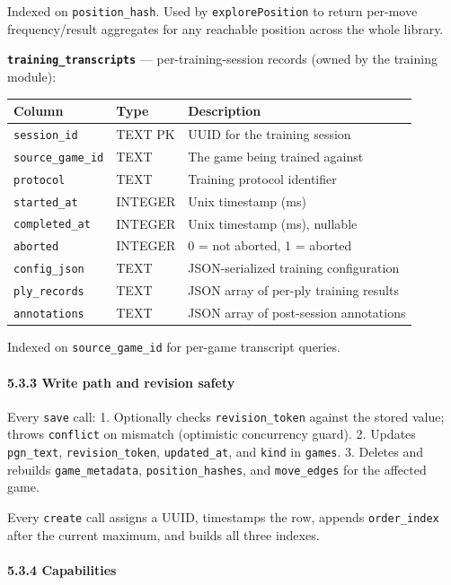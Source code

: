\documentclass[]{article}
\let\oldparagraph\paragraph
\renewcommand{\paragraph}[1]{\oldparagraph{#1}\mbox{}}
\begin{document}
Indexed on \texttt{position\_hash}. Used by \texttt{explorePosition} to
return per-move frequency/result aggregates for any reachable position
across the whole library.

\textbf{\texttt{training\_transcripts}} --- per-training-session records
(owned by the training module):

\begin{longtable}[]{@{}lll@{}}
\toprule
Column & Type & Description\tabularnewline
\midrule
\endhead
\texttt{session\_id} & TEXT PK & UUID for the training
session\tabularnewline
\texttt{source\_game\_id} & TEXT & The game being trained
against\tabularnewline
\texttt{protocol} & TEXT & Training protocol identifier\tabularnewline
\texttt{started\_at} & INTEGER & Unix timestamp (ms)\tabularnewline
\texttt{completed\_at} & INTEGER & Unix timestamp (ms),
nullable\tabularnewline
\texttt{aborted} & INTEGER & 0 = not aborted, 1 = aborted\tabularnewline
\texttt{config\_json} & TEXT & JSON-serialized training
configuration\tabularnewline
\texttt{ply\_records} & TEXT & JSON array of per-ply training
results\tabularnewline
\texttt{annotations} & TEXT & JSON array of post-session
annotations\tabularnewline
\bottomrule
\end{longtable}

Indexed on \texttt{source\_game\_id} for per-game transcript queries.

\paragraph{5.3.3 Write path and revision
safety}\label{write-path-and-revision-safety}

Every \texttt{save} call: 1. Optionally checks \texttt{revision\_token}
against the stored value; throws \texttt{conflict} on mismatch
(optimistic concurrency guard). 2. Updates \texttt{pgn\_text},
\texttt{revision\_token}, \texttt{updated\_at}, and \texttt{kind} in
\texttt{games}. 3. Deletes and rebuilds \texttt{game\_metadata},
\texttt{position\_hashes}, and \texttt{move\_edges} for the affected
game.

Every \texttt{create} call assigns a UUID, timestamps the row, appends
\texttt{order\_index} after the current maximum, and builds all three
indexes.

\paragraph{5.3.4 Capabilities}\label{capabilities}
\end{document}
